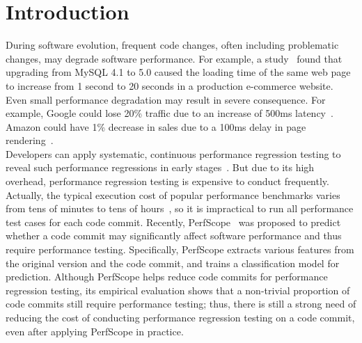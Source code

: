 \section{Introduction}
\label{sec:intro}
During software evolution, frequent code changes, often including problematic changes, may degrade software performance. For example, a study~\cite{huang2014performance} found that upgrading from MySQL 4.1 to 5.0 caused the loading time of the same web page to increase from 1 second to 20 seconds in a production e-commerce website. Even small performance degradation may result in severe consequence. For example, Google could lose 20\% traffic due to an increase of 500ms latency~\cite{Google}. Amazon could have 1\% decrease in sales due to a 100ms delay in page rendering~\cite{Stevefamov}. \\

Developers can apply systematic, continuous performance regression testing to reveal such performance regressions in early stages~\cite{foxref,poliniref,TSEPerform,MITCHELL,KALIBERA}. But due to its high overhead, performance regression testing is expensive to conduct frequently. Actually, the typical execution cost of popular performance benchmarks varies from tens of minutes to tens of hours~\cite{huang2014performance}, so it is impractical to run all performance test cases for each code commit. Recently, PerfScope~\cite{huang2014performance} was proposed to predict whether a code commit may significantly affect software performance and thus require performance testing. Specifically, PerfScope extracts various features from the original version and the code commit, and trains a classification model for prediction. Although PerfScope helps reduce code commits for performance regression testing, its empirical evaluation shows that a non-trivial proportion of code commits still require performance testing; thus, there is still a strong need of reducing the cost of conducting performance regression testing on a code commit, even after applying PerfScope in practice.\\



